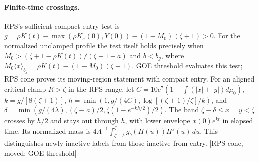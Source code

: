 \documentclass[11pt]{article}
\newcommand{\src}[1]{\textnormal{\small[#1]}}
\begin{document}
\paragraph{Finite-time crossings.}
RPS's sufficient compact-entry test is
\(g=\rho K(t)-\max(\rho K_s(0),Y(0))-(1-M_0)(\zeta+1)>0\).
For the normalized unclamped profile the test itself holds precisely
when \(M_0>(\zeta+1-\rho K(t))/(\zeta+1-a)\) and \(b<b_g\),
where \(M_0\langle x\rangle_{b_g}=\rho K(t)-(1-M_0)(\zeta+1)\).
GOE threshold evaluates this test; RPS cone proves its moving-region
statement with compact entry. For an aligned critical clamp \(R>\zeta\)
in the RPS range, let \(C=10e^7(1+\int(|x|+|y|)d\mu_0)\),
\(k=g/[8(\zeta+1)]\),
\(h=\min(1,g/(4C),\log[(\zeta+1)/\zeta]/k)\), and
\(\delta=\min(g/(4\lambda),(\zeta-a)/2,\zeta(1-e^{-kh/2})/2)\).
The band \(\zeta-\delta\le x=y<\zeta\) crosses by \(h/2\) and stays
out through \(h\), with lower envelope \(x(0)e^{kt}\) in elapsed time.
Its normalized mass is \(4A^{-1}\int_{\zeta-\delta}^\zeta
g_b(H(u))H'(u)\,du\). This distinguishes newly inactive labels
from those inactive from entry. \src{RPS cone, moved; GOE threshold}
\end{document}
